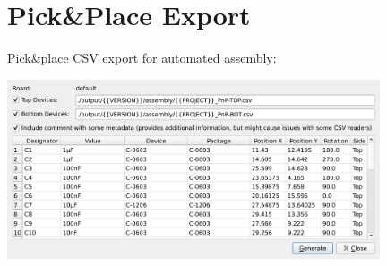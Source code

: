 \section{Pick\&Place Export}

\begin{frame}{\secname}

  Pick\&place CSV export for automated assembly:

  \begin{center}
    \includegraphics[width=11cm]{images/pnp_export.png}
  \end{center}

\end{frame}
